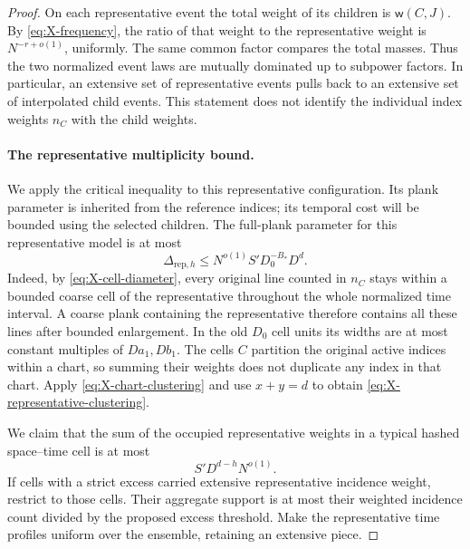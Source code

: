 \begin{proof}
On each representative event the total weight of its children is
$\mathsf w(C,J)$. By \eqref{eq:X-frequency}, the ratio of that
weight to the representative weight is $N^{-r+o(1)}$, uniformly.
The same common factor compares the total masses. Thus the two
normalized event laws are mutually dominated up to subpower
factors. In particular, an extensive set of representative events
pulls back to an extensive set of interpolated child events. This
statement does not identify the individual index weights $n_C$
with the child weights.

\paragraph{The representative multiplicity bound.}
We apply the critical inequality to this representative configuration.
Its plank parameter is inherited from the reference indices; its
temporal cost will be bounded using the selected children.
The full-plank parameter for this representative model is at most
\begin{equation}
 \Delta_{\mathrm{rep},h}
 \le N^{o(1)} S'D_0^{-B_*}D^d.
\label{eq:X-representative-clustering}
\end{equation}
Indeed, by \eqref{eq:X-cell-diameter}, every original line counted
in $n_C$ stays within a bounded coarse cell of the representative
throughout the whole normalized time interval. A coarse plank
containing the representative therefore contains all these lines
after bounded enlargement. In the old $D_0$ cell units its widths
are at most constant multiples of $Da_1,Db_1$. The cells $C$
partition the original active indices within a chart, so summing
their weights does not duplicate any index in that chart. Apply
\eqref{eq:X-chart-clustering} and use $x+y=d$ to obtain
\eqref{eq:X-representative-clustering}.

We claim that the sum of the occupied representative weights in a
typical hashed space--time cell is at most
\begin{equation}
 S'D^{d-h}N^{o(1)}.
\label{eq:X-representative-multiplicity}
\end{equation}
If cells with a strict excess carried extensive representative
incidence weight, restrict to those cells. Their aggregate support
is at most their weighted incidence count divided by the proposed
excess threshold. Make the representative time profiles uniform
over the ensemble, retaining an extensive piece.


\end{proof}
